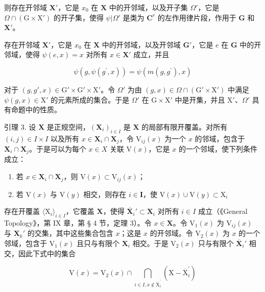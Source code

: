 则存在开邻域 \(\mathbf{X}'\)，它是 \(x_0\) 在 \(\mathbf{X}\) 中的开邻域，以及开子集 \(\Omega'\)，它是 \(\Omega \cap (\mathrm{G} \times \mathrm{X}')\) 的开子集，使得 \(\psi|\Omega'\) 是类为 \(\mathbf{C}^r\) 的左作用律片段，作用于 \(\mathbf{G}\) 和 \(\mathbf{X}'\)。

存在开邻域 \(\mathbf{X}'\)，它是 \(x_0\) 在 \(\mathbf{X}\) 中的开邻域，以及开邻域 \(\mathbf{G}'\)，它是 \(e\) 在 \(\mathbf{G}\) 中的开邻域，使得 \(\psi(e, x) = x\) 对所有 \(x \in \mathbf{X}'\) 成立，并且

\[
\psi (g, \psi (g ^ {\prime}, x)) = \psi (m (g, g ^ {\prime}), x)
\]

对于 \((g, g', x) \in \mathrm{G}' \times \mathrm{G}' \times \mathrm{X}'\)。令 \(\Omega'\) 为由 \((g, x) \in \Omega \cap (\mathrm{G}' \times \mathrm{X}')\) 中满足 \(\psi(g, x) \in \mathrm{X}'\) 的元素所成的集合。于是 \(\Omega'\) 在 \(\mathrm{G} \times \mathrm{X}'\) 中是开集，并且 \(\mathrm{X}'\)、\(\Omega'\) 具有命题中的性质。

引理 3. 设 \(\mathbf{X}\) 是正规空间，\((\mathbf{X}_i)_{i\in I}\) 是 \(\mathbf{X}\) 的局部有限开覆盖。对所有 \((i,j)\in I\times I\) 以及所有 \(x\in \mathbf{X}_i\cap \mathbf{X}_j\)，令 \(\mathrm{V}_{ij}(x)\) 为一个 \(x\) 的邻域，包含于 \(\mathbf{X}_i\cap \mathbf{X}_j\)。于是可以为每个 \(x\in X\) 关联 \(\mathrm{V}(x)\)，它是 \(x\) 的一个邻域，使下列条件成立：

\begin{enumerate}
\def\labelenumi{(\alph{enumi})}
\item
  若 \(x \in \mathbf{X}_i \cap \mathbf{X}_j\)，则 \(\mathrm{V}(x) \subset \mathrm{V}_{ij}(x)\)；
\item
  若 \(\mathrm{V}(x)\) 与 \(\mathrm{V}(y)\) 相交，则存在 \(i\in \mathbf{I}\)，使 \(\mathrm{V}(x)\cup \mathrm{V}(y)\subset \mathrm{X}_i\)
\end{enumerate}

存在开覆盖 \(\langle \mathrm{X}_i\rangle_{i\in I}\)，它覆盖 \(\mathbf{X}\)，使得 \(\overline{\mathbf{X}}_i' \subset \mathbf{X}_i\) 对所有 \(i \in I\) 成立（《General Topology》，第 IX 章，第 § 4 节，定理 3）。令 \(x \in \mathbf{X}\)。令 \(\mathrm{V}_1(x)\) 为 \(\mathrm{V}_{ij}(x)\) 与 \(\mathbf{X}_k'\) 的交集，其中这些集合包含 \(x\)；这是 \(x\) 的开邻域。令 \(\mathrm{V}_2(x)\) 为 \(x\) 的一个邻域，包含于 \(\mathrm{V}_1(x)\) 且只与有限个 \(\mathbf{X}_i\) 相交。于是 \(\mathrm{V}_2(x)\) 只与有限个 \(\overline{\mathbf{X}}_i'\) 相交，因此下式中的集合

\[
\mathrm{V} (x) = \mathrm{V} _ {2} (x) \cap \bigcap_ {i \in I, x \notin \overline {{\mathrm{X}}} _ {i} ^ {\prime}} (\mathrm{X} - \overline {{\mathrm{X}}} _ {i} ^ {\prime})
\]

